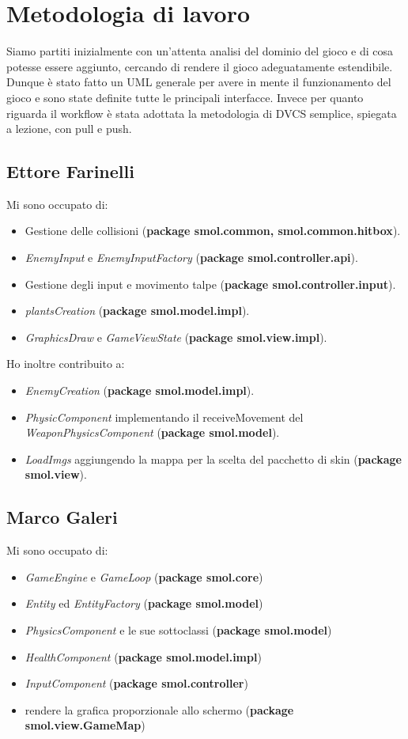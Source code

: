 \documentclass[a4paper,12pt]{report}
\begin{document}
\section{Metodologia di lavoro}

Siamo partiti inizialmente con un'attenta analisi del dominio del gioco e di cosa potesse essere aggiunto, cercando di rendere il gioco adeguatamente estendibile.
Dunque è stato fatto un UML generale per avere in mente il funzionamento del gioco e sono state definite tutte le principali interfacce.
Invece per quanto riguarda il workflow è stata adottata la metodologia di DVCS semplice, spiegata a lezione, con pull e push.

\subsection*{Ettore Farinelli}
Mi sono occupato di:
\begin{itemize}
    \item Gestione delle collisioni (\textbf{package smol.common, smol.common.hitbox}).
    \item \emph{EnemyInput} e \emph{EnemyInputFactory} (\textbf{package smol.controller.api}).
    \item Gestione degli input e movimento talpe (\textbf{package smol.controller.input}).
    \item \emph{plantsCreation} (\textbf{package smol.model.impl}).
    \item \emph{GraphicsDraw} e \emph{GameViewState} (\textbf{package smol.view.impl}).
\end{itemize}

Ho inoltre contribuito a:
\begin{itemize}
    \item \emph{EnemyCreation} (\textbf{package smol.model.impl}).
    \item \emph{PhysicComponent} implementando il receiveMovement del \emph{WeaponPhysicsComponent} (\textbf{package smol.model}).
    \item \emph{LoadImgs} aggiungendo la mappa per la scelta del pacchetto di skin (\textbf{package smol.view}).
\end{itemize}
\subsection*{Marco Galeri}

Mi sono occupato di:
\begin{itemize}
    \item \emph{GameEngine} e \emph{GameLoop} (\textbf{package smol.core})
    \item \emph{Entity} ed \emph{EntityFactory} (\textbf{package smol.model})
    \item \emph{PhysicsComponent} e le sue sottoclassi (\textbf{package smol.model})
    \item \emph{HealthComponent} (\textbf{package smol.model.impl})
    \item \emph{InputComponent} (\textbf{package smol.controller})
    \item rendere la grafica proporzionale allo schermo (\textbf{package smol.view.GameMap})
\end{itemize}
\end{document}
